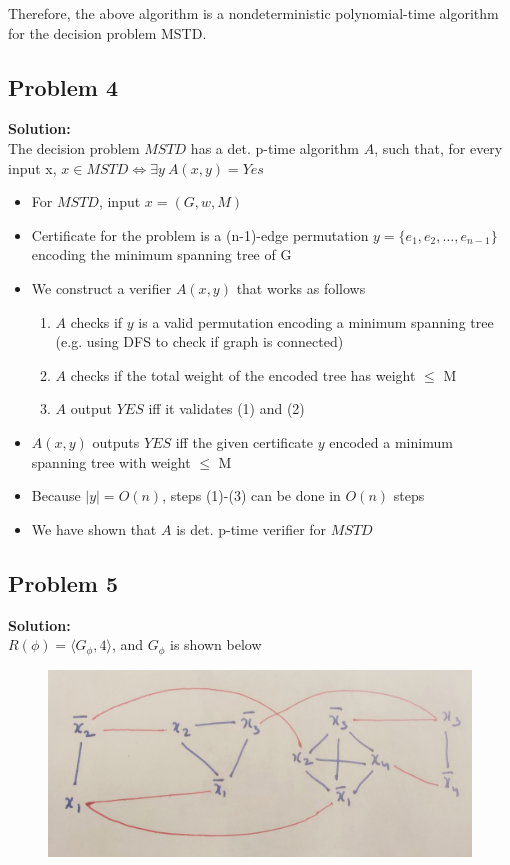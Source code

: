 \documentclass[12pt,a4paper]{article}
\newcommand{\solution}{\noindent\textbf{Solution:}\\\indent}
\begin{document}
Therefore, the above algorithm is a nondeterministic polynomial-time algorithm for the decision problem MSTD.

\newpage
\subsection*{Problem 4}
\solution
The decision problem $MSTD$ has a det. p-time algorithm $A$, such that, for every input x, $x \in MSTD \iff \exists y\ A(x,y) = Yes$

\begin{itemize}
    \item For $MSTD$, input $x = (G, w, M)$
    \item Certificate for the problem is a (n-1)-edge permutation $y = \{e_1, e_2, \hdots, e_{n-1}\}$ encoding the minimum spanning tree of G
    \item We construct a verifier $A(x,y)$ that works as follows
    \begin{enumerate}
        \item $A$ checks if $y$ is a valid permutation encoding a minimum spanning tree (e.g. using DFS to check if graph is connected)
        \item $A$ checks if the total weight of the encoded tree has weight $\leq$ M
        \item $A$ output $YES$ iff it validates (1) and (2)
    \end{enumerate}
    \item $A(x,y)$ outputs $YES$ iff the given certificate $y$ encoded a minimum spanning tree with weight $\leq$ M
    \item Because $|y| = O(n)$, steps (1)-(3) can be done in $O(n)$ steps
    \item We have shown that $A$ is det. p-time verifier for $MSTD$
\end{itemize}

\subsection*{Problem 5}
\solution
$R(\phi) = \langle G_{\phi}, 4\rangle$, and $G_{\phi}$ is shown below

\begin{figure}[H]
    \centering
    \includegraphics[width=15cm]{5.jpg}
\end{figure}
\end{document}
